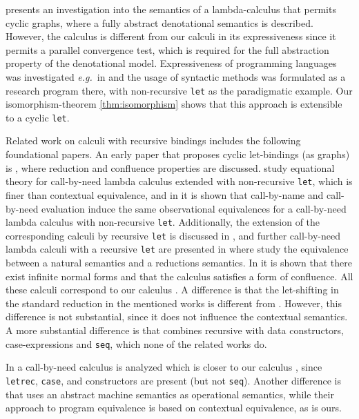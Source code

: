 \documentclass{LMCS}
\theoremstyle{plain}
\theoremstyle{definition}
\newcommand{\eg}{{\em e.g.}}
\newcommand{\tlet}{{\tt let}}
\newcommand{\tletrec}{{\tt letrec}}
\newcommand{\tcase}{{\tt case}}
\newcommand{\tseq}{{\tt seq}}
\begin{document}
\cite{jeffrey-short:94} presents an investigation into the semantics of a 
lambda-calculus that permits cyclic graphs, where a fully abstract denotational
semantics is described.
However, the calculus is different from our calculi in its expressiveness since
it permits a parallel convergence test, which is required for the full 
abstraction property of the denotational model. 
Expressiveness of programming languages was investigated 
\eg\ in \cite{Felleisen:91} and the usage of syntactic methods was formulated as
a research program there, with non-recursive \tlet{} as the paradigmatic example. 
Our isomorphism-theorem \ref{thm:isomorphism} shows that this approach is 
extensible to a cyclic \tlet{}.

Related work on calculi with recursive bindings includes the following 
foundational papers.
An early paper that proposes cyclic let-bindings (as graphs) 
is \cite{ariola-klop-short:94}, where reduction and confluence properties are
discussed.
\cite{ariola:95,ariola:97} study equational theory for call-by-need lambda
calculus extended with non-recursive \tlet{}, 
which is finer than contextual equivalence, and in \cite{maraistoderskywadler:98}
it is shown that call-by-name and call-by-need
evaluation induce the same observational equivalences for a call-by-need lambda
calculus with non-recursive \tlet{}.
Additionally, the extension of the corresponding calculi by recursive \tlet{} is
discussed in \cite{ariola:95,ariola:97}, and further call-by-need lambda calculi
with a recursive \tlet{} are presented 
in \cite{ariola-blom:97,ariola-blom:02,Nakata-hasegawa:2009:jfp} where 
\cite{Nakata-hasegawa:2009:jfp} study the equivalence between a natural 
semantics and a reductions semantics.
In \cite{ariola-blom:02} it is shown that there exist infinite normal forms and
that the calculus satisfies a form of confluence.
All these calculi correspond to our calculus .
A difference is that the let-shifting in the standard reduction in the mentioned works is different from .
However, this difference is not substantial, since it does not influence the contextual semantics.
A more substantial difference is that  combines 
recursive  with data constructors, case-expressions and \tseq, which none of the related works do.

In \cite{moran-sands:99} a call-by-need calculus is analyzed which is closer to
our calculus , since \tletrec, \tcase, and constructors are present (but not
\tseq).
Another difference is that \cite{moran-sands:99} uses an abstract machine semantics
as operational semantics, while their approach to program equivalence is based on
contextual equivalence, as is ours.
\end{document}
